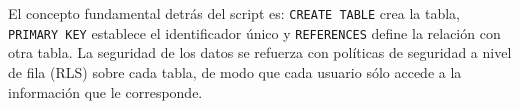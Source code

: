 El concepto fundamental detr\'as del script es: \texttt{CREATE TABLE}
crea la tabla, \texttt{PRIMARY KEY} establece el identificador \'unico y
\texttt{REFERENCES} define la relaci\'on con otra tabla. La seguridad de
los datos se refuerza con pol\'iticas de seguridad a nivel de fila
(RLS) sobre cada tabla, de modo que cada usuario s\'olo accede a la
informaci\'on que le corresponde.